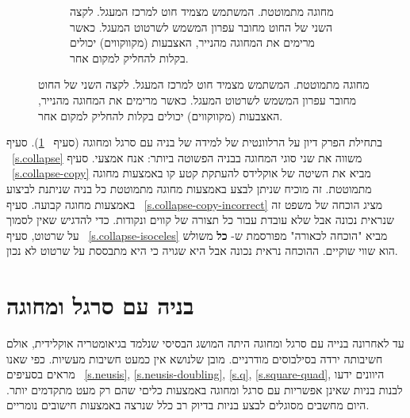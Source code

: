 \begin{figure}[htb]
\begin{center}
\begin{subfigure}[b]{.4\textwidth}
\caption{%
מחוגה מתמוטטת. המשתמש מצמיד חוט למרכז המעגל. לקצה השני של החוט מחובר עפרון המשמש לשרטוט המעגל. כאשר מרימים את המחוגה מהנייר, האצבעות (מקווקווים) יכולים בקלות להחליק למקום אחר.%
}\label{fig.collapsing-compass}
\end{subfigure}
\end{center}
\end{figure}

בתחילת הפרק דיון על הרלוונטית של למידה של בניה עם סרגל ומחוגה (סעיף%
~\ref{s.relevance}).
סעיף%
~\ref{s.collapse} 
משווה את שני סוגי המחוגה בבניה הפשוטה ביותר: אנח אמצעי. סעיף%
~\ref{s.collapse-copy}
מביא את השיטה של אוקלידס להעתקת קטע קו באמצעות מחוגה מתמוטטת. זה מוכיח שניתן לבצע באמצעות מחוגה מתמוטטת כל בניה שניתנת לביצוע באמצעות מחוגה קבועה. סעיף%
~\ref{s.collapse-copy-incorrect} 
מציג הוכחה של משפט זה שנראית נכונה אבל שלא עובדת עבור כל תצורה של קווים ונקודות. כדי להדגיש שאין לסמוך על שרטוט, סעיף%
~\ref{s.collapse-isoceles}
מביא "הוכחה לכאורה" מפורסמת ש-
\textbf{כל}
משולש הוא שווי שוקיים. ההוכחה נראית נכונה אבל היא שגויה כי היא מתבססת על שרטוט לא נכון.


\section{בניה עם סרגל ומחוגה}\label{s.relevance}

עד לאחרונה בנייה עם סרגל ומחוגה היתה המושג הבסיסי שנלמד בגיאומטריה אוקלידית, אולם חשיבותה ירדה בסילבוסים מודרניים. מובן שלנושא אין כמעט חשיבות מעשיות. כפי שאנו מראים בסעיפים%
~\ref{s.neusis}, \ref{s.neusis-doubling}, \ref{s.q}, \ref{s.square-quad},
היוונים ידעו לבנות בניות שאינן אפשריות עם סרגל ומחוגה באמצעות כליםי שהם רק מעט מתקדמים יותר. היום מחשבים מסוגלים לבצע בניות בדיוק רב כלל שנרצה באמצעות חישובים נומריים.

